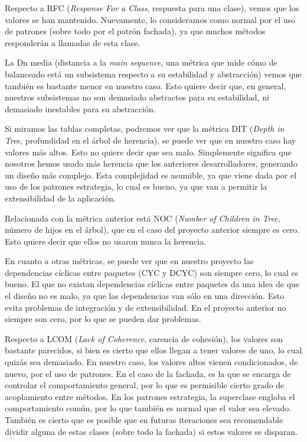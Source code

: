 Respecto a RFC (\textit{Response For a Class}, respuesta para una clase), vemos que los valores se han mantenido. Nuevamente, lo consideramos como normal por el uso de patrones (sobre todo por el patrón fachada), ya que muchos métodos responderán a llamadas de esta clase.

La Dn media (distancia a la \textit{main sequence}, una métrica que mide cómo de balanceado está un subsistema respecto a su estabilidad y abstracción) vemos que también es bastante menor en nuestro caso. Esto quiere decir que, en general, nuestros subsistemas no son demasiado abstractos para su estabilidad, ni demasiado inestables para su abstracción.

Si miramos las tablas completas, podremos ver que la métrica DIT (\textit{Depth in Tree}, profundidad en el árbol de herencia), se puede ver que en nuestro caso hay valores más altos. Esto no quiere decir que sea malo. Simplemente significa que nosotros hemos usado más herencia que los anteriores desarrolladores, generando un diseño más complejo. Esta complejidad es asumible, ya que viene dada por el uso de los patrones estrategia, lo cual es bueno, ya que van a permitir la extensibilidad de la aplicación.

Relacionada con la métrica anterior está NOC (\textit{Number of Children in Tree}, número de hijos en el árbol), que en el caso del proyecto anterior siempre es cero. Esto quiere decir que ellos no usaron nunca la herencia.

En cuanto a otras métricas, se puede ver que en nuestro proyecto las dependencias cíclicas entre paquetes (CYC y DCYC) son siempre cero, lo cual es bueno. El que no existan dependencias cíclicas entre paquetes da una idea de que el diseño no es malo, ya que las dependencias van sólo en una dirección. Esto evita problemas de integración y de extensibilidad. En el proyecto anterior no siempre son cero, por lo que se pueden dar problemas.

Respecto a LCOM (\textit{Lack of Coherence}, carencia de cohesión), los valores son bastante parecidos, si bien es cierto que ellos llegan a tener valores de uno, lo cual quizás sea demasiado. En nuestro caso, los valores altos vienen condicionados, de nuevo, por el uso de patrones. En el caso de la fachada, es la que se encarga de controlar el comportamiento general, por lo que es permisible cierto grado de acoplamiento entre métodos. En los patrones estrategia, la superclase engloba el comportamiento común, por lo que también es normal que el valor sea elevado. También es cierto que es posible que en futuras iteraciones sea recomendable dividir alguna de estas clases (sobre todo la fachada) si estos valores se disparan.

